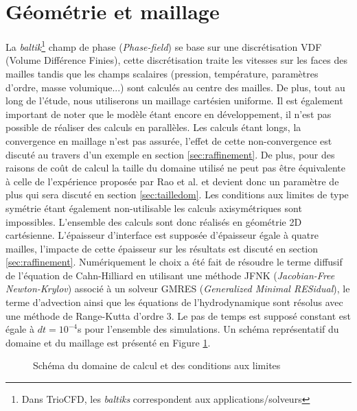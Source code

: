 \section{Géométrie et maillage}
La \textit{baltik}\footnote{Dans TrioCFD, les \textit{baltiks} correspondent aux applications/solveurs} champ de phase (\textit{Phase-field}) se base sur une discrétisation VDF (Volume Différence Finies), cette discrétisation traite les vitesses sur les faces des mailles tandis que les champs scalaires (pression, température, paramètres d'ordre, masse volumique...) sont calculés au centre des mailles. De plus, tout au long de l'étude, nous utiliserons un maillage cartésien uniforme.
Il est également important de noter que le modèle étant encore en développement, il n'est pas possible de réaliser des calculs en parallèles. Les calculs étant longs, la convergence en maillage n'est pas assurée, l'effet de cette non-convergence est discuté au travers d'un exemple en section \ref{sec:raffinement}. De plus, pour des raisons de coût de calcul la taille du domaine utilisé ne peut pas être équivalente à celle de l'expérience proposée par Rao et al. et devient donc un paramètre de plus qui sera discuté en section \ref{sec:tailledom}. Les conditions aux limites de type symétrie étant également non-utilisable les calculs axisymétriques sont impossibles. L'ensemble des calculs sont donc réalisés en géométrie 2D cartésienne. L'épaisseur d'interface est supposée d'épaisseur égale à quatre mailles, l'impacte de cette épaisseur sur les résultats est discuté en section \ref{sec:raffinement}. Numériquement le choix a été fait de résoudre le terme diffusif de l'équation de Cahn-Hilliard en utilisant une méthode JFNK (\textit{Jacobian-Free Newton-Krylov}) associé à un solveur GMRES (\textit{Generalized Minimal RESidual}), le terme d'advection ainsi que les équations de l'hydrodynamique sont résolus avec une méthode de Range-Kutta d'ordre 3. Le pas de temps est supposé constant est égale à $dt = 10^{-4}$s pour l'ensemble des simulations. Un schéma représentatif du domaine et du maillage est présenté en Figure \ref{fig:Presentation_Dom}.

\begin{figure}[H]
	\centering
	\small
	\caption{Schéma du domaine de calcul et des conditions aux limites}
	\label{fig:Presentation_Dom}
\end{figure}

